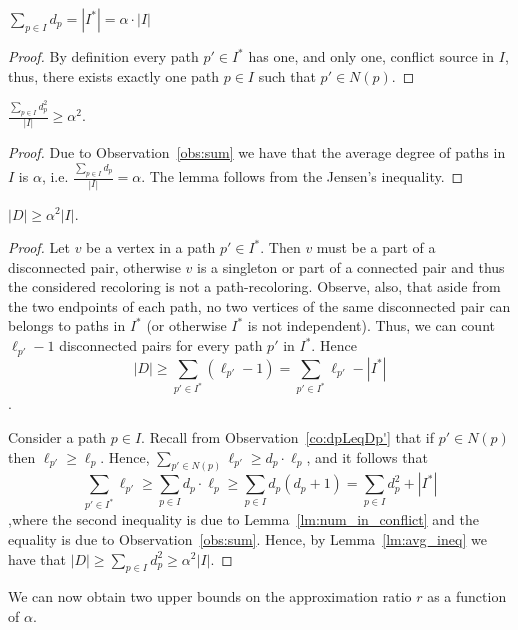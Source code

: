 \begin{observation}
\label{obs:sum}
$\sum_{p \in I}{d_p} = |I^*| = \alpha \cdot |I|$
\end{observation}
\begin{proof}
By definition every path $p' \in I^*$ has one, and only one, conflict
source in $I$, thus, 
there exists exactly one path $p \in I$ such that $p' \in N(p)$.
{}\end{proof}


\begin{lemma}
\label{lm:avg_ineq}
$\frac{\sum_{p \in I}{d_p^2}}{|I|} \geq \alpha^2$.
\end{lemma}
\begin{proof}
Due to Observation~\ref{obs:sum} we have that the average degree of
paths in $I$ is $\alpha$, i.e. $\frac{\sum_{p \in I}{d_p}}{|I|}
= \alpha$.  The lemma follows from the Jensen's inequality.
{}\end{proof}


\begin{lemma}
\label{lemma:alpha-squared}
$|D| \geq \alpha^2|I|$.
\end{lemma}
\begin{proof}
Let $v$ be a vertex in a path $p' \in I^*$.
Then $v$ must be a part of
a disconnected pair, otherwise $v$ is a singleton or part of a
connected pair and thus the considered recoloring is not a
path-recoloring.  Observe, also, that aside from the two endpoints of
each path, no two vertices of the same disconnected pair can belongs to paths
in $I^*$ (or otherwise $I^*$ is not independent).  
Thus, we can count $\ell_{p'} - 1$ disconnected pairs for every path $p'$ in
$I^*$.  
Hence
\[
|D| \geq \sum_{p' \in I^*} (\ell_{p'} - 1) = \sum_{p' \in I^*}{\ell_{p'}} -
|I^*|
\].

Consider a path $p \in I$. 
Recall from Observation~\ref{co:dpLeqDp'} that if $p' \in N(p)$ 
then $\ell_{p'} \geq \ell_p$.
%
Hence, 
$\sum_{p' \in N(p)}{\ell_{p'}} \geq d_p \cdot \ell_p$, 
and it follows that
\[
\sum_{p' \in I^*} \ell_{p'}
\geq \sum_{p \in I} d_p \cdot \ell_p
\geq \sum_{p \in I} d_p(d_p+1)
=    \sum_{p \in I} d_p^2 + |I^*|
\]
,where the second inequality is due to Lemma~\ref{lm:num_in_conflict}
and the equality is due to Observation~\ref{obs:sum}.
Hence, by Lemma~\ref{lm:avg_ineq} we have that
\(
|D| \geq \sum_{p \in I} d_p^2 \geq \alpha^2 |I|
\).
{}\end{proof}

We can now obtain two upper bounds on the approximation ratio $r$ as a
function of $\alpha$. 

